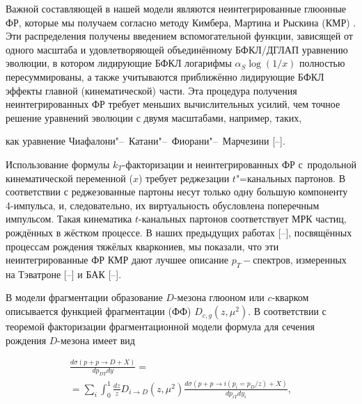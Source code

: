 Важной составляющей в нашей модели являются неинтегрированные глюонные ФР, которые мы получаем согласно методу Кимбера, Мартина и Рыскина (КМР) \cite{KMR}. Эти распределения получены введением  вспомогательной функции, зависящей от одного масштаба и удовлетворяющей объединённому БФКЛ\slash ДГЛАП уравнению эволюции, в котором лидирующие БФКЛ логарифмы $\alpha_S\log (1/x)$ полностью пересуммированы, а также учитываются приближённо лидирующие БФКЛ эффекты главной (кинематической) части. Эта процедура получения неинтегрированных ФР требует меньших вычислительных усилий, чем точное решение уравнений эволюции с двумя масштабами, например, таких, 

как уравнение Чиафалони"--~Катани"--~Фиорани"--~Марчезини [--].



Использование формулы $k_{T}$-факторизации и неинтегрированных ФР \linebreak с~продольной кинематической переменной ($x$) требует реджезации $t$"=канальных партонов. В соответствии с \cite{KTLipatov,LipVyaz} реджезованные партоны несут только одну большую компоненту 4-импульса, и, следовательно, их виртуальность обусловлена поперечным импульсом. Такая кинематика $t$-канальных партонов  соответствует МРК частиц, рождённых в жёстком процессе. В наших предыдущих работах [--], посвящённых процессам рождения тяжёлых кваркониев, мы показали, что эти неинтегрированные ФР КМР дают лучшее описание $p_T-$спектров, измеренных на Тэватроне [--] и БАК [--].



В модели фрагментации образование $D$-мезона глюоном или $c$-кварком описывается функцией фрагментации (ФФ) $D_{c,g}(z,\mu^2)$. В соответствии с теоремой факторизации фрагментационной модели формула для сечения рождения $D$-мезона имеет вид \cite{MeleNason}

\begin{multline}

\frac{d\sigma(p+p\to D+ X)}{dp_{DT} dy}=

\\

=

 \sum_i \int_0^1

\frac{dz}{z} D_{i\to D}(z,\mu^2) \frac{d\sigma(p+p\to i(p_i=p_D/z)+

X)}{dp_{iT}dy_i},\label{eq:frag}

\end{multline}


